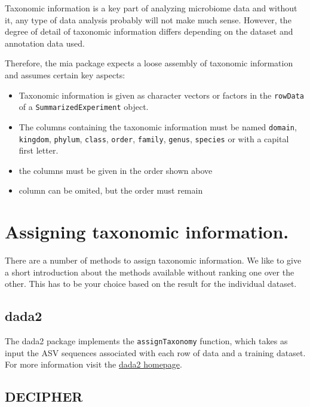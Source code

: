 \documentclass[
]{book}
\providecommand{\tightlist}{%
  \setlength{\itemsep}{0pt}\setlength{\parskip}{0pt}}
\begin{document}
Taxonomic information is a key part of analyzing microbiome data and without
it, any type of data analysis probably will not make much sense. However,
the degree of detail of taxonomic information differs depending on the dataset
and annotation data used.

Therefore, the mia package expects a loose assembly of taxonomic information
and assumes certain key aspects:

\begin{itemize}
\tightlist
\item
  Taxonomic information is given as character vectors or factors in the
  \texttt{rowData} of a \texttt{SummarizedExperiment} object.
\item
  The columns containing the taxonomic information must be named \texttt{domain},
  \texttt{kingdom}, \texttt{phylum}, \texttt{class}, \texttt{order}, \texttt{family}, \texttt{genus}, \texttt{species} or with
  a capital first letter.
\item
  the columns must be given in the order shown above
\item
  column can be omited, but the order must remain
\end{itemize}

\hypertarget{assigning-taxonomic-information.}{%
\section{Assigning taxonomic information.}\label{assigning-taxonomic-information.}}

There are a number of methods to assign taxonomic information. We like to give
a short introduction about the methods available without ranking one over the
other. This has to be your choice based on the result for the individual
dataset.

\hypertarget{dada2}{%
\subsection{dada2}\label{dada2}}

The dada2 package \citep{Callahan2016dada2} implements the \texttt{assignTaxonomy} function, which
takes as input the ASV sequences associated with each row of data and a training
dataset. For more information visit the
\href{https://benjjneb.github.io/dada2/assign.html}{dada2 homepage}.

\hypertarget{decipher}{%
\subsection{DECIPHER}\label{decipher}}
\end{document}
